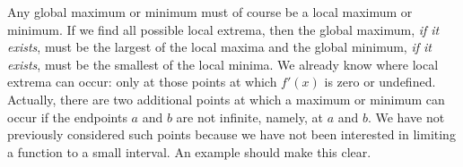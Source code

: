 Any global maximum or minimum must of course be a local maximum or
minimum. If we find all possible local extrema, then the global
maximum, {\it if it exists}, must be the largest of the local maxima
and the global minimum, {\it if it exists}, must be the smallest of
the local minima. We already know where local extrema can occur: only
at those points at which $f'(x)$ is zero or undefined. Actually, there
are two additional points at which a maximum or minimum can occur if
the endpoints $a$ and $b$ are not infinite, namely, at $a$ and $b$. We
have not previously considered such points because we have not been
interested in limiting a function to a small interval. An example
should make this clear.

